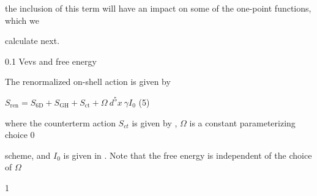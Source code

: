 \documentclass[a4paper,12pt]{article}
\begin{document}
the inclusion of this term will have an impact on some of the one-point functions, which we

calculate next.

0.1 Vevs and free energy

The renormalized on-shell action is given by
\begin{center}
$S_{\mathrm{r}\mathrm{e}\mathrm{n}}=S_{6\mathrm{D}}+S_{\mathrm{G}\mathrm{H}}+S_{\mathrm{c}\mathrm{t}}+\Omega\ d^{5}x\ \gamma I_{0}$   (5)
\end{center}
where the counterterm action $S_{ct}$ is given by , $\Omega$ is a constant parameterizing choice $0$

scheme, and $I_{0}$ is given in . Note that the free energy is independent of the choice of $\Omega$

1
\end{document}
